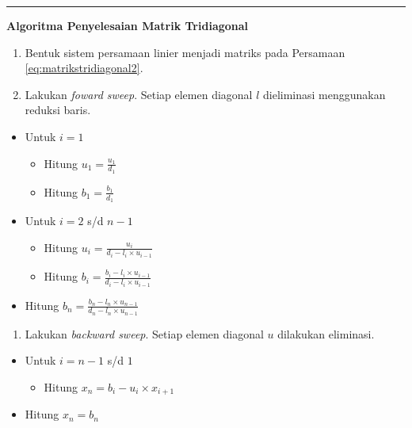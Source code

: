 \documentclass[]{book}
\providecommand{\tightlist}{%
  \setlength{\itemsep}{0pt}\setlength{\parskip}{0pt}}
\theoremstyle{definition}
\theoremstyle{definition}
\theoremstyle{definition}
\theoremstyle{remark}
\begin{document}
\begin{center}\rule{0.5\linewidth}{\linethickness}\end{center}

\textbf{Algoritma Penyelesaian Matrik Tridiagonal}

\begin{enumerate}
\def\labelenumi{\arabic{enumi}.}
\tightlist
\item
  Bentuk sistem persamaan linier menjadi matriks pada Persamaan \eqref{eq:matrikstridiagonal2}.
\item
  Lakukan \emph{foward sweep}. Setiap elemen diagonal \(l\) dieliminasi menggunakan reduksi baris.
\end{enumerate}

\begin{itemize}
\item
  Untuk \(i=1\)

  \begin{itemize}
  \tightlist
  \item
    Hitung \(u_1=\frac{u_1}{d_1}\)
  \item
    Hitung \(b_1=\frac{b_1}{d_1}\)
  \end{itemize}
\item
  Untuk \(i=2\) s/d \(n-1\)

  \begin{itemize}
  \tightlist
  \item
    Hitung \(u_i=\frac{u_i}{d_i-l_i\times u_{i-1}}\)
  \item
    Hitung \(b_i=\frac{b_i-l_i\times u_{i-1}}{d_i-l_i\times u_{i-1}}\)
  \end{itemize}
\item
  Hitung \(b_n=\frac{b_n-l_n\times u_{n-1}}{d_n-l_n\times u_{n-1}}\)
\end{itemize}

\begin{enumerate}
\def\labelenumi{\arabic{enumi}.}
\setcounter{enumi}{2}
\tightlist
\item
  Lakukan \emph{backward sweep}. Setiap elemen diagonal \(u\) dilakukan eliminasi.
\end{enumerate}

\begin{itemize}
\item
  Untuk \(i=n-1\) s/d \(1\)

  \begin{itemize}
  \tightlist
  \item
    Hitung \(x_n=b_i-u_i\times x_{i+1}\)
  \end{itemize}
\item
  Hitung \(x_n=b_n\)
\end{itemize}
\end{document}

